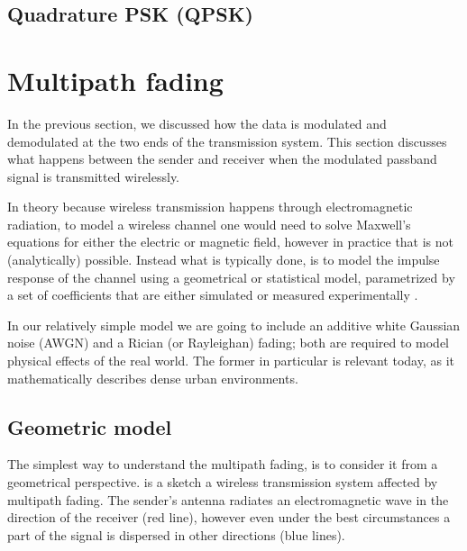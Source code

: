 
\subsection{Quadrature PSK (QPSK)}


\section{Multipath fading} \label{sec:multipath-fading}

In the previous section, we discussed how the data is modulated and demodulated at the two ends of the transmission system. This section discusses what happens between the sender and receiver when the modulated passband signal is transmitted wirelessly.

In theory because wireless transmission happens through electromagnetic radiation, to model a wireless channel one would need to solve Maxwell's equations for either the electric or magnetic field, however in practice that is not (analytically) possible. Instead what is typically done, is to model the impulse response of the channel using a geometrical or statistical model, parametrized by a set of coefficients that are either simulated or measured experimentally \cite{Gallager}.

In our relatively simple model we are going to include an additive white Gaussian noise (AWGN) and a Rician (or Rayleighan) fading; both are required to model physical effects of the real world. The former in particular is relevant today, as it mathematically describes dense urban environments.

\subsection{Geometric model}

The simplest way to understand the multipath fading, is to consider it from a geometrical perspective.  is a sketch a wireless transmission system affected by multipath fading. The sender's antenna radiates an electromagnetic wave in the direction of the receiver (red line), however even under the best circumstances a part of the signal is dispersed in other directions (blue lines).

